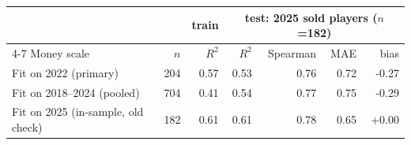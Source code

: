 \begin{tabular}{@{}lrrrrrr@{}}\toprule
& & train & \multicolumn{4}{c}{test: 2025 sold players ($n$=182)}\\\cmidrule(l){4-7}
Money scale & $n$ & $R^2$ & $R^2$ & Spearman & MAE & bias\\\midrule
Fit on 2022 (primary) & 204 & 0.57 & 0.53 & 0.76 & 0.72 & -0.27\\
Fit on 2018--2024 (pooled) & 704 & 0.41 & 0.54 & 0.77 & 0.75 & -0.29\\
Fit on 2025 (in-sample, old check) & 182 & 0.61 & 0.61 & 0.78 & 0.65 & +0.00\\
\bottomrule\end{tabular}
